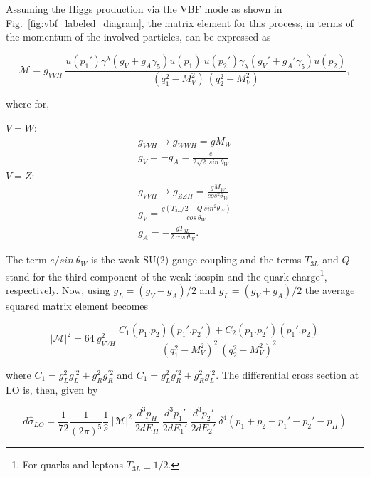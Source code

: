 Assuming the Higgs production via the VBF mode as shown in Fig.~\ref{fig:vbf_labeled_diagram}, the matrix element for this process, in terms of the momentum of the involved particles, can be expressed as \cite{bib:PhysLettB136-3-1984}

\begin{equation}
\mathcal{M} = g_{VVH}~\frac{\bar{u}(p_{1}')\gamma^{\lambda}(g_{V}+g_{A}\gamma_{5})\bar{u}(p_{1})~\bar{u}(p_{2}')\gamma_{\lambda}(g_{V}'+g_{A}'\gamma_{5})\bar{u}(p_{2})}{(q_{1}^{2}-M_{V}^{2})~(q_{2}^{2}-M_{V}^{2})},
\end{equation}

where for,

\begin{multicols}{2}
$V = W$:
\begin{eqnarray}
g_{VVH} \rightarrow g_{WWH} = gM_{W}\\
g_{V} = -g_{A} = \frac{e}{2\sqrt{2}~sin~\theta_{W}}
\end{eqnarray}
$V = Z$:
\begin{eqnarray}
g_{VVH} \rightarrow g_{ZZH} = \frac{gM_{W}}{cos^{2}\theta_{W}}\\
g_{V} = \frac{g(T_{3L}/2 - Q~sin^{2}\theta_{W})}{cos~\theta_{W}}\\
g_{A} = - \frac{gT_{3L}}{2~cos~\theta_{W}}.
\end{eqnarray}
\end{multicols}

The term $e/sin~\theta_{W}$ is the weak SU(2) gauge coupling and the terms $T_{3L}$ and $Q$ stand for the third component of the weak isospin and the quark charge\footnote{For quarks and leptons $T_{3L} \pm 1/2$.}, respectively. Now, using $g_{L} = (g_{V}-g_{A})/2$ and $g_{L} = (g_{V}+g_{A})/2$ the average squared matrix element becomes \cite{bib:PhysLettB136-3-1984,bib:PhysRep457-1-2005,bib:NuclPhysB287-1987}

\begin{equation}
|\mathcal{M}|^{2} = 64~g_{VVH}^{2}~\frac{C_{1}(p_{1}.p_{2})(p_{1}'.p_{2}') + C_{2}(p_{1}.p_{2}')(p_{1}'.p_{2})}{(q_{1}^{2}-M_{V}^{2})^{2}~(q_{2}^{2}-M_{V}^{2})^{2}}
\end{equation}

where $C_{1} = g_{L}^{2}g_{L}^{'2} + g_{R}^{2}g_{R}^{'2}$ and $C_{1} = g_{L}^{2}g_{R}^{'2} + g_{R}^{2}g_{L}^{'2}$. The differential cross section at LO is, then, given by \cite{bib:PhysRep457-1-2005}

\begin{equation}
d\hat{\sigma}_{LO} = \frac{1}{72}\frac{1}{(2\pi)^{5}}\frac{1}{\hat{s}}~|\mathcal{M}|^{2}~\frac{d^{3}p_{H}}{2dE_{H}}~\frac{d^{3}p_{1}'}{2dE_{1}'}~\frac{d^{3}p_{2}'}{2dE_{2}'}~\delta^{4}(p_{1}+p_{2}-p_{1}'-p_{2}'-p_{H})
\end{equation}

